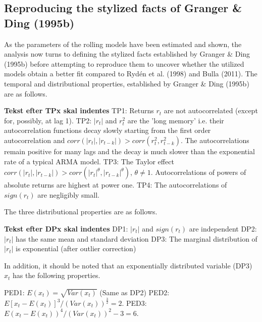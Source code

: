 \subsection{Reproducing the stylized facts of Granger \& Ding (1995b)}
\label{section:stylized_facts_GD}

As the parameters of the rolling models have been estimated and shown, the analysis now turns to defining the stylized facts established by Granger \& Ding (1995b) before attempting to reproduce them to uncover whether the utilized models obtain a better fit compared to Rydén et al. (1998) and Bulla (2011). The temporal and distributional properties, established by Granger \& Ding (1995b) are as follows.

\textbf{Tekst efter TPx skal indentes \newline}
TP1: Returns $r_t$ are not autocorrelated (except for, possibly, at lag 1). \newline
TP2: $|r_t|$ and $r_t^2$ are the 'long memory' i.e. their autocorrelation functions decay slowly starting from the first order autocorrelation and $corr(|r_t|, |r_{t-k}|) > corr(r_t^2, r^2_{t-k})$. The autocorrelations remain positive for many lags and the decay is much slower than the exponential rate of a typical ARMA model. \newline
TP3: The Taylor effect $corr(|r_t|, |r_{t-k}|) > corr(|r_t|^{\theta}, |r_{t-k}|^{\theta})$, $\theta \neq 1$. Autocorrelations of powers of absolute returns are highest at power one. \newline
TP4: The autocorrelations of $sign(r_t)$ are negligibly small.

The three distributional properties are as follows.

\textbf{Tekst efter DPx skal indentes \newline}
DP1: $|r_t|$ and $sign(r_t)$ are independent\newline
DP2: $|r_t|$ has the same mean and standard deviation \newline
DP3: The marginal distribution of $|r_t|$ is exponential (after outlier correction)

In addition, it should be noted that an exponentially distributed variable (DP3) $x_t$ has the following properties.

PED1: $E(x_t) = \sqrt{Var(x_t)}$ (Same as DP2) \newline
PED2: $E[x_t-E(x_t)]^3 / (Var(x_t))^{\frac{3}{2}} = 2.$ \newline
PED3: $E(x_t-E(x_t))^4 / (Var(x_t))^{2} -3 = 6.$

